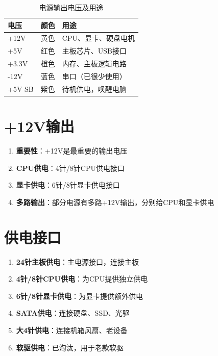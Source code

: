 \documentclass[12pt,UTF8]{ctexbook}
\begin{document}
\begin{table}[H]
    \centering
    \begin{tabular}{|p{2cm}|p{3cm}|p{6cm}|}
        \hline
        \textbf{电压} & \textbf{颜色} & \textbf{用途} \\
        \hline
        +12V & 黄色 & CPU、显卡、硬盘电机 \\
        \hline
        +5V & 红色 & 主板芯片、USB接口 \\
        \hline
        +3.3V & 橙色 & 内存、主板逻辑电路 \\
        \hline
        -12V & 蓝色 & 串口（已很少使用） \\
        \hline
        +5V SB & 紫色 & 待机供电，唤醒电脑 \\
        \hline
    \end{tabular}
    \caption{电源输出电压及用途}
    \label{tab:psu_voltages}
\end{table}

\section{+12V输出}

\begin{enumerate}
    \item \textbf{重要性}：+12V是最重要的输出电压
    \item \textbf{CPU供电}：4针/8针CPU供电接口
    \item \textbf{显卡供电}：6针/8针显卡供电接口
    \item \textbf{多路输出}：部分电源有多路+12V输出，分别给CPU和显卡供电
\end{enumerate}

\section{供电接口}

\begin{enumerate}
    \item \textbf{24针主板供电}：主电源接口，连接主板
    \item \textbf{4针/8针CPU供电}：为CPU提供独立供电
    \item \textbf{6针/8针显卡供电}：为显卡提供额外供电
    \item \textbf{SATA供电}：连接硬盘、SSD、光驱
    \item \textbf{大4针供电}：连接机箱风扇、老设备
    \item \textbf{软驱供电}：已淘汰，用于老款软驱
\end{enumerate}
\end{document}
